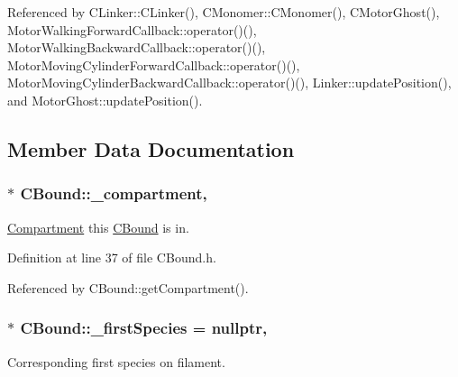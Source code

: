 Referenced by C\+Linker\+::\+C\+Linker(), C\+Monomer\+::\+C\+Monomer(), C\+Motor\+Ghost(), Motor\+Walking\+Forward\+Callback\+::operator()(), Motor\+Walking\+Backward\+Callback\+::operator()(), Motor\+Moving\+Cylinder\+Forward\+Callback\+::operator()(), Motor\+Moving\+Cylinder\+Backward\+Callback\+::operator()(), Linker\+::update\+Position(), and Motor\+Ghost\+::update\+Position().



\subsection{Member Data Documentation}
\hypertarget{classCBound_a95a66719b898cf32e60ae7137186bbbf}{
\subsubsection[{\+\_\+compartment}]{$\ast$ C\+Bound\+::\+\_\+compartment\hspace{0.3cm}{\ttfamily [protected]}, {\ttfamily [inherited]}}}\label{classCBound_a95a66719b898cf32e60ae7137186bbbf}


\hyperlink{classCompartment}{Compartment} this \hyperlink{classCBound}{C\+Bound} is in. 



Definition at line 37 of file C\+Bound.\+h.



Referenced by C\+Bound\+::get\+Compartment().

\hypertarget{classCBound_a7ee4f44fd39c414be1f7b74b1031c1ce}{
\subsubsection[{\+\_\+first\+Species}]{$\ast$ C\+Bound\+::\+\_\+first\+Species = nullptr\hspace{0.3cm}{\ttfamily [protected]}, {\ttfamily [inherited]}}}\label{classCBound_a7ee4f44fd39c414be1f7b74b1031c1ce}


Corresponding first species on filament. 



